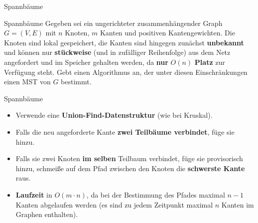 \begin{frame}[t]{Spannbäume}
\end{frame}

\begin{frame}{Spannbäume}
	Gegeben sei ein ungerichteter zusammenhängender Graph $G = (V, E)$ mit $n$ Knoten, $m$ Kanten und positiven Kantengewichten. Die Knoten sind lokal gespeichert, die Kanten sind hingegen zunächst \textbf{unbekannt} und können nur \textbf{stückweise} (und in zufälliger Reihenfolge) aus dem Netz angefordert und im Speicher gehalten werden, da \textbf{nur} $O(n)$ \textbf{Platz} zur Verfügung steht. Gebt einen Algorithmus an, der unter diesen Einschränkungen einen MST von $G$ bestimmt.
\end{frame}

\begin{frame}{Spannbäume}
	\solutionheading
	\begin{itemize}
		\item Verwende eine \textbf{Union-Find-Datenstruktur} (wie bei Kruskal). 
		\item Falls die neu angeforderte Kante \textbf{zwei Teilbäume verbindet}, füge sie hinzu. 
		\item Falls sie zwei Knoten \textbf{im selben} Teilbaum verbindet, füge sie provisorisch hinzu, schmeiße auf dem Pfad zwischen den Knoten die \textbf{schwerste Kante} raus. 
		\item \textbf{Laufzeit} in $O(m \cdot n)$, da bei der Bestimmung des Pfades maximal $n-1$ Kanten abgelaufen werden (es sind zu jedem Zeitpunkt maximal $n$ Kanten im Graphen enthalten).
	\end{itemize}
\end{frame}


